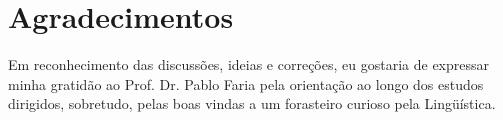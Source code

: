 \section*{Agradecimentos}

Em reconhecimento das discussões, ideias e correções, eu gostaria de expressar minha gratidão ao Prof. Dr. Pablo Faria pela orientação ao longo dos estudos dirigidos, sobretudo, pelas boas vindas a um forasteiro curioso pela Lingüística.